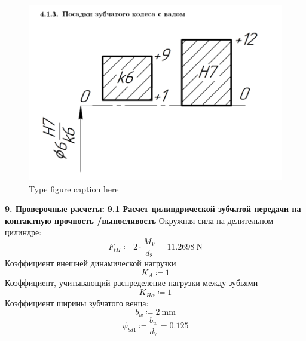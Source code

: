\documentclass{article}
\newcommand{\defeq}{\coloneq} %
\begin{document}
\begin{figure}[h!]
 \begin{center}
  \includegraphics[max width=\textwidth]{calculations/401.png}
  \caption{Type figure caption here}
  \label{fig:401}
 \end{center}
\end{figure}
\colorbox[HTML]{000000}{\textbf{9. Проверочные расчеты:}}\newline
\colorbox[HTML]{000000}{\textbf{9.1 Расчет цилиндрической зубчатой передачи на контактную прочность /выносливость}}\newline
\colorbox[HTML]{000000}{Окружная сила на делительном цилиндре:}\newline
\begin{equation*}
F_{tH} \defeq 2 \cdot \frac{M_{V}}{\textit{d}_{\textit{8}}} = {11.2698 \: \mathrm{N}}
\end{equation*}
\colorbox[HTML]{000000}{Коэффициент внешней динамической нагрузки}\newline
\begin{equation*}
K_{A} \defeq 1
\end{equation*}
\colorbox[HTML]{000000}{Коэффициент, учитывающий распределение нагрузки между зубьями}\newline
\begin{equation*}
K_{Hα} \defeq 1
\end{equation*}
\colorbox[HTML]{000000}{Коэффициент ширины зубчатого венца:}\newline
\begin{equation*}
b_{w} \defeq 2 \: \mathrm{mm}
\end{equation*}
\begin{equation*}
\textit{ψ}_{\textit{bd1}} \defeq \frac{b_{w}}{\textit{d}_{\textit{7}}} = {0.125}
\end{equation*}
\end{document}
